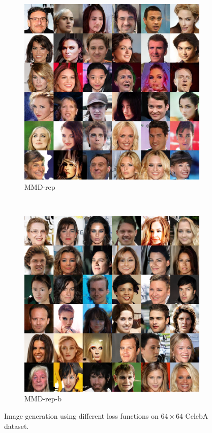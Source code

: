 \documentclass{article} %
\theoremstyle{plain}
\newtheorem*{proposition 1*}{Proposition 1}
\begin{document}
\begin{appendices}
\begin{figure}[tb]
	\begin{subfigure}[t]{0.45\linewidth}
		\centering
		\includegraphics[width=1\textwidth]{celebA_rep.png}
		\caption{MMD-rep\label{fig:sample_celebA_rep}}
	\end{subfigure}
	~
	\begin{subfigure}[t]{0.45\linewidth}
		\centering
		\includegraphics[width=1\textwidth]{celebA_rmb.png}
		\caption{MMD-rep-b\label{fig:sample_celebA_rmb}}
	\end{subfigure}
	\caption{Image generation using different loss functions on \(64\times64\) CelebA dataset.}  
	\label{fig:samples_celebA}
\end{figure}


\end{appendices}
\end{document}
